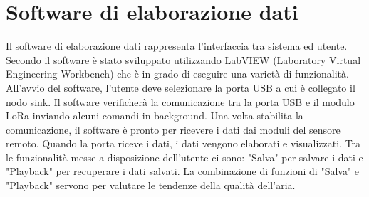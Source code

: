 \documentclass[a4paper]{report} %
\begin{document}
\section{Software di elaborazione dati}
Il software di elaborazione dati rappresenta l'interfaccia tra sistema ed utente. Secondo \cite{art:rif.40} il software è stato sviluppato utilizzando LabVIEW (Laboratory Virtual Engineering Workbench) che è in grado di eseguire una varietà di funzionalità. All'avvio del software, l'utente deve selezionare la porta USB a cui è collegato il nodo sink. Il software verificherà la comunicazione tra la porta USB e il modulo LoRa inviando alcuni comandi in background. Una volta stabilita la comunicazione, il software è pronto per ricevere i dati dai moduli del sensore remoto. Quando la porta riceve i dati, i dati vengono elaborati e visualizzati. Tra le funzionalità messe a disposizione dell'utente ci sono: "Salva" per salvare i dati e "Playback" per recuperare i dati salvati. La combinazione di funzioni di "Salva" e "Playback" servono per valutare le tendenze della qualità dell'aria. 
\end{document}
